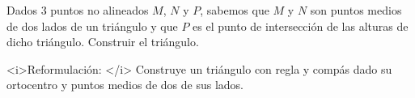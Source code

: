 Dados $3$ puntos no alineados $M$, $N$ y $P$, sabemos que $M$ y $N$ son puntos medios de dos lados de un triángulo y que $P$ es el punto de intersección de las alturas de dicho triángulo. Construir el triángulo. \newline 

<i>Reformulación: </i> Construye un triángulo con regla y compás dado su ortocentro y puntos medios de dos de sus lados.